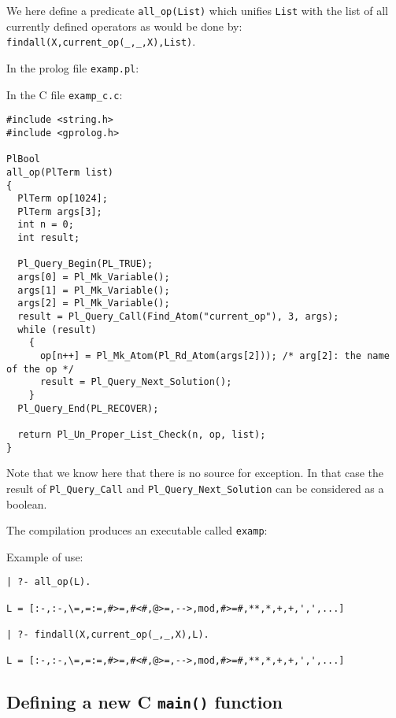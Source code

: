 We here define a predicate \texttt{all\_op(List)} which unifies
\texttt{List} with the list of all currently defined operators as would be done by: \texttt{findall(X,current\_op(\_,\_,X),List)}.

In the prolog file \texttt{examp.pl}:


In the C file \texttt{examp\_c.c}:

\begin{Indentation}
\begin{verbatim}
#include <string.h>
#include <gprolog.h>

PlBool
all_op(PlTerm list)
{
  PlTerm op[1024];
  PlTerm args[3];
  int n = 0;
  int result;

  Pl_Query_Begin(PL_TRUE);
  args[0] = Pl_Mk_Variable();
  args[1] = Pl_Mk_Variable();
  args[2] = Pl_Mk_Variable();
  result = Pl_Query_Call(Find_Atom("current_op"), 3, args);
  while (result)
    {
      op[n++] = Pl_Mk_Atom(Pl_Rd_Atom(args[2])); /* arg[2]: the name of the op */
      result = Pl_Query_Next_Solution();
    }
  Pl_Query_End(PL_RECOVER);

  return Pl_Un_Proper_List_Check(n, op, list);
}
\end{verbatim}
\end{Indentation}

Note that we know here that there is no source for exception. In that case
the result of \texttt{Pl\_Query\_Call} and \texttt{Pl\_Query\_Next\_Solution}
can be considered as a boolean.

The compilation produces an executable called \texttt{examp}:


Example of use:

\begin{Indentation}
\begin{verbatim}
| ?- all_op(L).

L = [:-,:-,\=,=:=,#>=,#<#,@>=,-->,mod,#>=#,**,*,+,+,',',...]

| ?- findall(X,current_op(_,_,X),L).

L = [:-,:-,\=,=:=,#>=,#<#,@>=,-->,mod,#>=#,**,*,+,+,',',...]
\end{verbatim}
\end{Indentation}


\subsection{Defining a new C \texttt{main()} function}

